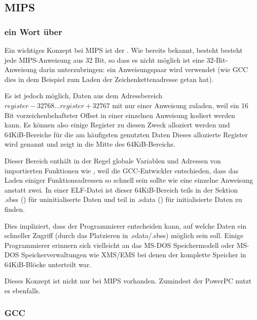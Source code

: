 \subsection{MIPS}

\subsubsection{ein Wort über }
\label{MIPS_GP}


Ein wichtiges Konzept bei MIPS ist der .
Wie bereits bekannt, besteht besteht jede MIPS-Anweisung aus 32 Bit, so dass es
nicht möglich ist eine 32-Bit-Anweisung darin unterzubringen: ein Anweisungspaar
wird verwendet (wie GCC dies in dem Beispiel zum Laden der Zeichenkettenadresse
getan hat).

Es ist jedoch möglich, Daten aus dem Adressbereich $register-32768...register+32767$
mit nur einer Anweisung zuladen, weil ein 16 Bit vorzeichenbehafteter Offset
in einer einzelnen Anweisung kodiert werden kann.
Es können also einige Register zu diesen Zweck alloziert werden und 64KiB-Bereiche
für die am häufigsten genutzten Daten
Dieses allozierte Register wird  genannt und zeigt in die Mitte
des 64KiB-Bereichs.

Dieser Bereich enthält in der Regel globale Variablen und Adressen von importierten
Funktionen wie \printf, weil die GCC-Entwickler entschieden, dass das Laden einiger
Funktionsadressen so schnell sein sollte wie eine einzelne Anweisung anstatt zwei.
In einer ELF-Datei ist dieser 64KiB-Bereich teils in der Sektion .sbss ()
für uninitialiserte Daten und teil in .sdata () für initialisierte
Daten zu finden.

Dies impliziert, dass der Programmierer entscheiden kann, auf welche Daten ein schneller
Zugriff (durch das Platzieren in .sdata/.sbss) möglich sein soll.
Einige Programmierer  erinnern sich vielleicht an das MS-DOS
Speichermodell  oder MS-DOS Speicherverwaltungen wie XMS/EMS
bei denen der komplette Speicher in 64KiB-Blöcke unterteilt war.


Dieses Konzept ist nicht nur bei MIPS vorhanden. Zumindest der PowerPC nutzt es ebenfalls.

\subsubsection{\Optimizing GCC}

